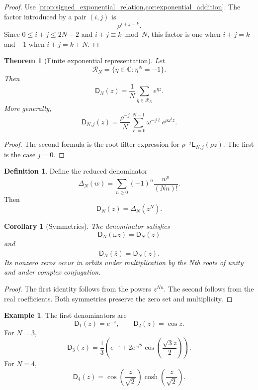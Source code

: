 \documentclass[11pt,letterpaper]{article}
\newtheorem{theorem}{Theorem}[section]
\newtheorem{corollary}[corollary]{Corollary}
\theoremstyle{definition}
\newtheorem{definition}[definition]{Definition}
\newtheorem{example}[example]{Example}
\theoremstyle{remark}
\newcommand{\CC}{\mathbb C}
\newcommand{\Rcal}{\mathcal R}
\newcommand{\Dfun}{\mathsf D}
\newcommand{\Efun}{\mathsf E}
\begin{document}
\begin{proof}
Use \cref{prop:signed_exponential_relation,cor:exponential_addition}.  The factor introduced by a pair $(i,j)$ is
\[
\rho^{i+j-k}.
\]
Since $0\leq i+j\leq2N-2$ and $i+j\equiv k\bmod N$, this factor is one when $i+j=k$ and $-1$ when $i+j=k+N$.
\end{proof}

\begin{theorem}[Finite exponential representation]\label{thm:finite_exponential_representation}
Let
\[
\Rcal_N=\{\eta\in\CC\mathrel{:}\eta^N=-1\}.
\]
Then
\[
\Dfun_N(z)
=
\frac1N\sum_{\eta\in\Rcal_N}e^{\eta z}.
\]
More generally,
\[
\Dfun_{N,j}(z)
=
\frac{\rho^{-j}}N
\sum_{\ell=0}^{N-1}
\omega^{-j\ell}e^{\rho\omega^\ell z}.
\]
\end{theorem}

\begin{proof}
The second formula is the root filter expression for $\rho^{-j}\Efun_{N,j}(\rho z)$.  The first is the case $j=0$.
\end{proof}

\begin{definition}\label{def:reduced_denominator}
Define the reduced denominator
\[
\Delta_N(w)
=
\sum_{n\geq0}(-1)^n\frac{w^n}{(Nn)!}.
\]
Then
\[
\Dfun_N(z)=\Delta_N(z^N).
\]
\end{definition}

\begin{corollary}[Symmetries]\label{cor:denominator_symmetries}
The denominator satisfies
\[
\Dfun_N(\omega z)=\Dfun_N(z)
\]
and
\[
\Dfun_N(\overline z)=\overline{\Dfun_N(z)}.
\]
Its nonzero zeros occur in orbits under multiplication by the $N$th roots of unity and under complex conjugation.
\end{corollary}

\begin{proof}
The first identity follows from the powers $z^{Nn}$.  The second follows from the real coefficients.  Both symmetries preserve the zero set and multiplicity.
\end{proof}

\begin{example}\label{ex:small_denominators}
The first denominators are
\[
\Dfun_1(z)=e^{-z},
\qquad
\Dfun_2(z)=\cos z.
\]
For $N=3$,
\[
\Dfun_3(z)
=
\frac13\left(
e^{-z}
+2e^{z/2}\cos\left(\frac{\sqrt3z}{2}\right)
\right).
\]
For $N=4$,
\[
\Dfun_4(z)
=
\cos\left(\frac z{\sqrt2}\right)
\cosh\left(\frac z{\sqrt2}\right).
\]
\end{example}
\end{document}
